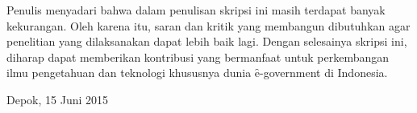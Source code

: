 Penulis menyadari bahwa dalam penulisan skripsi ini masih terdapat banyak kekurangan. Oleh karena itu, saran dan kritik yang membangun dibutuhkan agar penelitian yang dilaksanakan dapat lebih baik lagi. Dengan selesainya skripsi ini, diharap dapat memberikan kontribusi yang bermanfaat untuk perkembangan ilmu pengetahuan dan teknologi khususnya dunia \f{e-government} di Indonesia.
\vspace*{0.1cm}
\begin{flushright}
Depok, 15 Juni 2015\\[0.1cm]
\vspace*{1cm}
\penulis

\end{flushright}